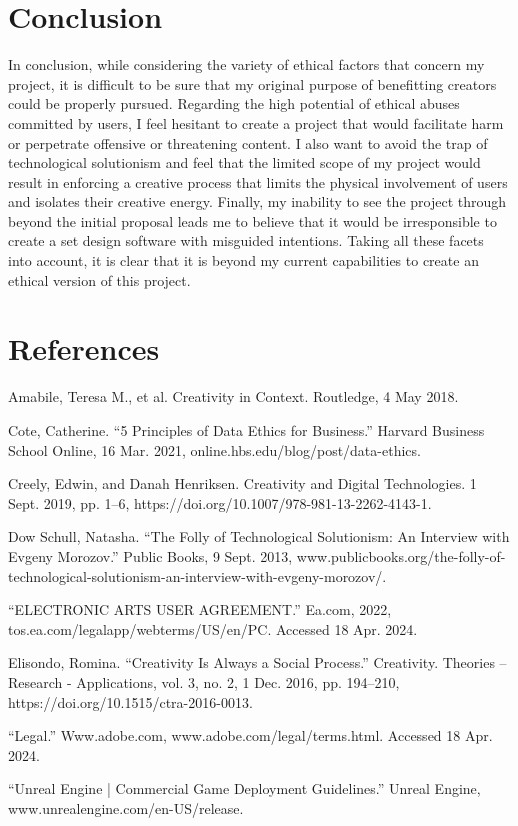 \documentclass[10pt,twocolumn]{article}
\begin{document}
\section{Conclusion}
In conclusion, while considering the variety of ethical factors that concern my project, it is difficult to be sure that my original purpose of benefitting creators could be properly pursued. Regarding the high potential of ethical abuses committed by users, I feel hesitant to create a project that would facilitate harm or perpetrate offensive or threatening content. I also want to avoid the trap of technological solutionism and feel that the limited scope of my project would result in enforcing a creative process that limits the physical involvement of users and isolates their creative energy. Finally, my inability to see the project through beyond the initial proposal leads me to believe that it would be irresponsible to create a set design software with misguided intentions. Taking all these facets into account, it is clear that it is beyond my current capabilities to create an ethical version of this project.  
\section{References}
\begin{hangparas}{.25in}{1}
Amabile, Teresa M., et al. Creativity in Context. Routledge, 4 May 2018.

Cote, Catherine. “5 Principles of Data Ethics for Business.” Harvard Business School Online, 16 Mar. 2021, online.hbs.edu/blog/post/data-ethics.

Creely, Edwin, and Danah Henriksen. Creativity and Digital Technologies. 1 Sept. 2019, pp. 1–6, https://doi.org/10.1007/978-981-13-2262-4143-1.

Dow Schull, Natasha. “The Folly of Technological Solutionism: An Interview with Evgeny Morozov.” Public Books, 9 Sept. 2013, www.publicbooks.org/the-folly-of-technological-solutionism-an-interview-with-evgeny-morozov/.

“ELECTRONIC ARTS USER AGREEMENT.” Ea.com, 2022, tos.ea.com/legalapp/webterms/US/en/PC. Accessed 18 Apr. 2024.

Elisondo, Romina. “Creativity Is Always a Social Process.” Creativity. Theories – Research - Applications, vol. 3, no. 2, 1 Dec. 2016, pp. 194–210, https://doi.org/10.1515/ctra-2016-0013.

“Legal.” Www.adobe.com, www.adobe.com/legal/terms.html. Accessed 18 Apr. 2024.

“Unreal Engine | Commercial Game Deployment Guidelines.” Unreal Engine, www.unrealengine.com/en-US/release.
\end{hangparas}
\end{document}
